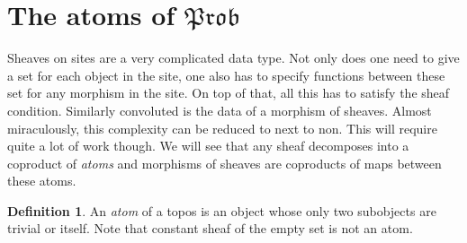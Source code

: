 \documentclass[a4paper]{amsproc}
\theoremstyle{plain}
\theoremstyle{definition}
\newtheorem{definition}[theorem]{Definition}
\theoremstyle{remark}
\numberwithin{equation}{section}
\begin{document}
\section{The atoms of $\mathfrak{Prob}$ }
Sheaves on sites are a very complicated data type. Not only does one need to give a set for each object in the site, one also has to specify functions between these set for any morphism in the site. On top of that, all this has to satisfy the sheaf condition. Similarly convoluted is the data of a morphism of sheaves.\newline
\indent Almost miraculously, this complexity can be reduced to next to non. This will require quite a lot of work though. We will see that any sheaf decomposes into a coproduct of \emph{atoms} and morphisms of sheaves are coproducts of maps between these atoms.
\begin{definition} An \emph{atom} of a topos is an object whose only two subobjects are trivial or itself. Note that constant sheaf of the empty set is not an atom.
\end{definition}
\end{document}

